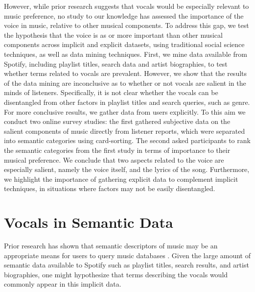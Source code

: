 \documentclass{article}
\begin{document}
However, while prior research suggests that vocals would be especially relevant to music preference, no study to our knowledge has assessed the importance of the voice in music, relative to other musical components. To address this gap, we test the hypothesis that the voice is as or more important than other musical components across implicit and explicit datasets, using traditional social science techniques, as well as data mining techniques.
First, we mine data available from Spotify, including playlist titles, search data and artist biographies, to test whether terms related to vocals are prevalent.
However, we show that the results of the data mining are inconclusive as to whether or not vocals are salient in the minds of listeners. Specifically, it is not clear whether the vocals can be disentangled from other factors in playlist titles and search queries, such as genre.
For more conclusive results, we gather data from users explicitly. To this aim we conduct two online survey studies: the first gathered subjective data on the salient components of music directly from listener reports, which were separated into semantic categories using card-sorting. The second asked participants to rank the semantic categories from the first study in terms of importance to their musical preference. We conclude that two aspects related to the voice are especially salient, namely the voice itself, and the lyrics of the song. Furthermore, we highlight the importance of gathering explicit data to complement implicit techniques, in situations where factors may not be easily disentangled.

\section{Vocals in Semantic Data}
Prior research has shown that semantic descriptors of music may be an appropriate means for users to query music databases \cite{lesaffre2008potential}. Given the large amount of semantic data available to Spotify such as playlist titles, search results, and artist biographies, one might hypothesize that terms describing the vocals would commonly appear in this implicit data.
\end{document}
